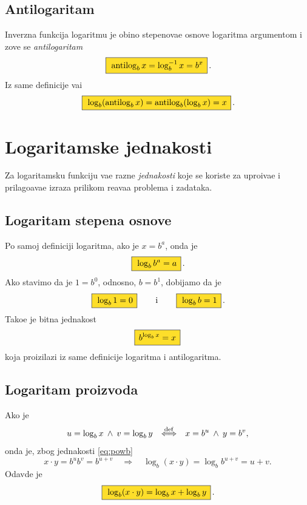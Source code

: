 \documentclass[12pt, twoside, a4paper]{article}
\def\land{\mathbin{\>\wedge\>}}
\def\logb{\log_b}
\def\okvir#1{\,\fcolorbox{black}{Goldenrod}{$\,\displaystyle{\mathstrut #1}\,$}\,}
\def\sledi{{\quad\Rightarrow\quad}}
\def\podef{{\quad\buildrel\rm def\over\Longleftrightarrow\quad}}
\begin{document}
\subsection{Antilogaritam}

\def\antilog{\mathop{\rm antilog}\nolimits}
Inverzna funkcija logaritmu
je obi{\cv}no stepenova{\nj}e osnove logaritma argumentom i zove se {\sl antilogaritam}
\begin{equation}
\okvir{\antilog_b x = \logb^{-1}x =  b^x}.
\end{equation}
Iz same definicije va{\zv}i
\begin{equation}
\okvir{\log_b(\antilog_b x)=\antilog_b(\log_b x)=x}.
\end{equation}


\section{Logaritamske jednakosti}

Za logaritamsku funkciju va{\zv}e razne {\sl jednakosti\/} koje se koriste za 
upro{\sv}{\cc}iva{\nj}e i pri\-la\-go\-{\dj}a\-va\-{\nj}e izraza prilikom re{\sv}ava{\nj}a
problema i zadataka.

\subsection{Logaritam stepena osnove}

Po samoj definiciji logaritma, ako je $x=b^a$, onda je
\begin{equation}
\okvir{\logb b^a=a}.
\label{eq:powb}
\end{equation}
Ako stavimo da je $1=b^0$, odnosno, $b=b^1$, dobijamo da je
\begin{equation}
\okvir{\logb 1=0}\qquad\text{i}\qquad\okvir{\logb b=1}.
\end{equation}
Tako{\dj}e je bitna jednakost
\begin{equation}
\okvir{b^{\logb x}=x}
\end{equation}
koja proizilazi iz same definicije logaritma i antilogaritma.

\subsection{Logaritam proizvoda}

Ako je
$$
u=\logb x\land v=\log_b y \podef x=b^u\land y=b^v,
$$
onda je, zbog jednakosti \eqref{eq:powb}
$$
x\cdot y=b^ub^v=b^{u+v}\sledi \logb(x\cdot y)=\logb b^{u+v}=u+v.
$$
Odavde je
\begin{equation}
\okvir{\logb(x\cdot y)=\logb x+\logb y}.
\label{eq:lnmul}
\end{equation}
\end{document}
